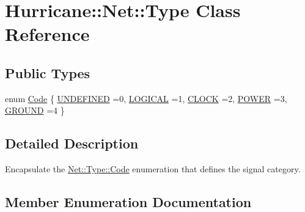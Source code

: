\hypertarget{classHurricane_1_1Net_1_1Type}{}\section{Hurricane\+:\+:Net\+:\+:Type Class Reference}
\label{classHurricane_1_1Net_1_1Type}
\subsection*{Public Types}
\begin{DoxyCompactItemize}
\item 
enum \hyperlink{classHurricane_1_1Net_1_1Type_a2652e3299403e0f5979a848b267163a5}{Code} \{ \newline
\hyperlink{classHurricane_1_1Net_1_1Type_a2652e3299403e0f5979a848b267163a5a973ba9d650b909a277813926d7ec4f96}{U\+N\+D\+E\+F\+I\+N\+ED} =0, 
\newline
\hyperlink{classHurricane_1_1Net_1_1Type_a2652e3299403e0f5979a848b267163a5a8f454d4a48d8dbdd7d6341e7285b4a35}{L\+O\+G\+I\+C\+AL} =1, 
\newline
\hyperlink{classHurricane_1_1Net_1_1Type_a2652e3299403e0f5979a848b267163a5a94d77dd6484c8f8524a3960d42d3974b}{C\+L\+O\+CK} =2, 
\newline
\hyperlink{classHurricane_1_1Net_1_1Type_a2652e3299403e0f5979a848b267163a5a0b7ce81772b3f4df72edb083a52b2748}{P\+O\+W\+ER} =3, 
\newline
\hyperlink{classHurricane_1_1Net_1_1Type_a2652e3299403e0f5979a848b267163a5a87f5f36bbfcfac211f3dff73a8e46e65}{G\+R\+O\+U\+ND} =4
 \}
\end{DoxyCompactItemize}


\subsection{Detailed Description}
Encapsulate the \hyperlink{classHurricane_1_1Net_1_1Type_a2652e3299403e0f5979a848b267163a5}{Net\+::\+Type\+::\+Code} enumeration that defines the signal category. 

\subsection{Member Enumeration Documentation}
\mbox{\label{classHurricane_1_1Net_1_1Type_a2652e3299403e0f5979a848b267163a5}} 
